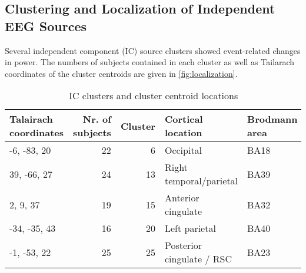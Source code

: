 \subsection{Clustering and Localization of Independent EEG Sources}
Several independent component (IC) source clusters showed event-related changes in power. The numbers of subjects contained in each cluster as well as Tailarach coordinates of the cluster centroids are given in \ref{fig:localization}.

\begin{table}
\caption{\label{tab:}IC clusters and cluster centroid locations}
\centering
\begin{tabular}[t]{l|r|r|l|l}
\hline
Talairach coordinates & Nr. of subjects & Cluster & Cortical location & Brodmann area\\
\hline
-6, -83, 20 & 22 & 6 & Occipital & BA18\\
\hline
39, -66, 27 & 24 & 13 & Right temporal/parietal & BA39\\
\hline
2, 9, 37 & 19 & 15 & Anterior cingulate & BA32\\
\hline
-34, -35, 43 & 16 & 20 & Left parietal & BA40\\
\hline
-1, -53, 22 & 25 & 25 & Posterior cingulate / RSC & BA23\\
\hline
\end{tabular}
\end{table}

%